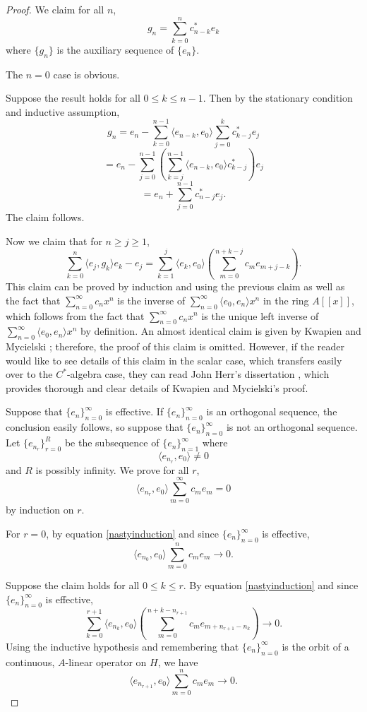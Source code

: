 \documentclass[11pt]{amsart}
\theoremstyle{definition}
\numberwithin{equation}{section}
\begin{document}
\begin{proof}
We claim for all $n$, $$g_{n}=\sum_{k=0}^{n}c_{n-k}^{*}e_{k}$$
where $\{g_{n}\}$ is the auxiliary sequence of $\{e_{n}\}$.

The $n=0$ case is obvious.

Suppose the result holds for all $0\leq k\leq n-1$.
Then by the stationary condition and inductive assumption,
$$g_{n}=e_{n}-\sum_{k=0}^{n-1}\langle e_{n-k},e_{0}\rangle \sum_{j=0}^{k}c_{k-j}^{*}e_{j}$$
$$=e_{n}-\sum_{j=0}^{n-1}\left(\sum_{k=j}^{n-1}\langle e_{n-k},e_{0}\rangle c_{k-j}^{*} \right)e_{j}$$
$$=e_{n}+\sum_{j=0}^{n-1}c_{n-j}^{*}e_{j}.$$
The claim follows.

Now we claim that for $n\geq j\geq 1$,
\begin{equation}\label{nastyinduction}
\sum_{k=0}^{n}\langle e_{j},g_{k}\rangle e_{k}-e_{j}=\sum_{k=1}^{j}\langle e_{k},e_{0}\rangle \left(\sum_{m=0}^{n+k-j}c_{m}e_{m+j-k} \right).    
\end{equation}
This claim can be proved by induction and using the previous claim as well as the fact that $\sum_{n=0}^{\infty}c_{n}x^{n}$ is the inverse of $\sum_{n=0}^{\infty}\langle e_{0},e_{n}\rangle x^{n}$ in the ring $A[[x]]$, which follows from the fact that $\sum_{n=0}^{\infty}c_{n}x^{n}$ is the unique left inverse of $\sum_{n=0}^{\infty}\langle e_{0},e_{n}\rangle x^{n}$ by definition. An almost identical claim is given by Kwapien and Mycielski \cite{Kwapien2001Kaczmarz}; therefore, the proof of this claim is omitted. However, if the reader would like to see details of this claim in the scalar case, which transfers easily over to the $C^{*}$-algebra case, they can read John Herr's dissertation \cite{Herr2016Fourier}, which provides thorough and clear details of Kwapien and Mycielski's proof.

Suppose that 
$\{e_{n}\}_{n=0}^{\infty}$ is effective. If $\{e_{n}\}_{n=0}^{\infty}$ is an orthogonal sequence, the conclusion easily follows, so suppose that $\{e_{n}\}_{n=0}^{\infty}$ is not an orthogonal sequence.
Let $\{e_{n_{r}}\}_{r=0}^{R}$ be the subsequence of $\{e_{n}\}_{n=1}^{\infty}$ where 
$$\langle e_{n_{r}}, e_{0}\rangle \neq 0 $$ and $R$ is possibly infinity. We prove for all $r$,
$$\langle e_{n_{r}},e_{0}\rangle \sum_{m=0}^{\infty}c_{m}e_{m}=0$$ by induction on $r$.

For $r=0$, by equation \ref{nastyinduction} and since $\{e_{n}\}_{n=0}^{\infty}$ is effective,
$$\langle e_{n_{0}},e_{0}\rangle \sum_{m=0}^{n}c_{m}e_{m}\to 0.$$

Suppose the claim holds for all $0\leq k\leq r$. By equation \ref{nastyinduction} and since $\{e_{n}\}_{n=0}^{\infty}$ is effective,
$$\sum_{k=0}^{r+1}\langle e_{n_{k}},e_{0}\rangle \left( \sum_{m=0}^{n+k-n_{r+1}}c_{m}e_{m+n_{r+1}-n_{k}} \right) \to 0.$$
Using the inductive hypothesis and remembering that $\{e_{n}\}_{n=0}^{\infty}$ is the orbit of a continuous, $A$-linear operator on $H$, we have
$$\langle e_{n_{r+1}},e_{0}\rangle \sum_{m=0}^{n}c_{m}e_{m}\to 0.$$


\end{proof}
\end{document}
